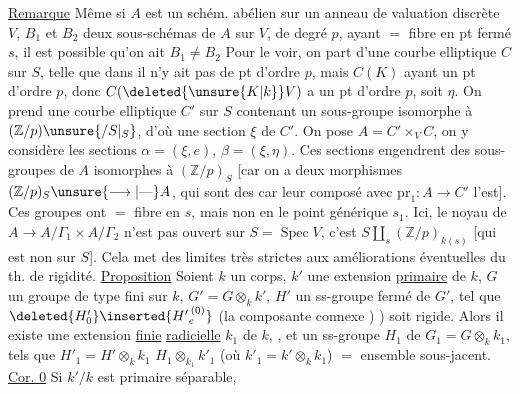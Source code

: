 \uline{Remarque} Même si $A$ est un schém.
\margin{\rule[-3\baselineskip]{0.35pt}{3\baselineskip}\kern2pt\rule[-3\baselineskip]{0.35pt}{3\baselineskip}}abélien sur un anneau de valuation discrète $V$,
$B_1$ et $B_2$ deux sous-schémas  de $A$  
sur $V$, de degré $p$, ayant $=$ fibre
en  pt fermé $s$, il est possible qu'on ait $B_1\ne B_2$
Pour le voir, on part d'une courbe elliptique
 $C$ sur $S$, telle que dans  il n'y ait
pas de pt d'ordre $p$, mais $C(K)$
ayant un pt d'ordre $p$, donc $C(\deleted{\unsure{K|k}}V)$
a un pt d'ordre $p$, soit $\eta$. On
prend une courbe elliptique $C'$ sur $S$
contenant un sous-groupe isomorphe à $(\mathbb Z/p)\unsure{/S|_S}$,
d'où une section $\xi$ de $C'$. On
pose $A=C'\times_V C$, on y considère
les sections $\alpha=(\xi,e)$, $\beta=(\xi,\eta)$. Ces
sections engendrent des sous-groupes  de
$A$ isomorphes à $(\mathbb Z/p)_S$ [car
on a deux morphismes $(\mathbb Z/p)_S\unsure{\longrightarrow|\text{---}}A$,
qui sont des  car leur composé avec $\mathrm{pr}_1:A\longrightarrow C'$ l'est].
Ces groupes ont $=$  fibre en $s$, mais non
en le point générique $s_1$. Ici,
le noyau de $A\longrightarrow A/\Gamma_1\times A/\Gamma_2$ 
n'est pas  ouvert sur $S=\operatorname{Spec} V$, c'est
$S\amalg_s(\mathbb Z/p)_{k(s)}$ [qui est non  sur $S$].
Cela met des limites très strictes aux
améliorations éventuelles du th. de rigidité.
\uline{Proposition} Soient $k$ un corps, $k'$ une extension
\margin{\rule[-4\baselineskip]{0.35pt}{4\baselineskip}}\uline{primaire} de $k$, $G$ un groupe  de type fini sur
$k$, $G'=G\otimes_k k'$, $H'$ un ss-groupe fermé de
$G'$, tel que $\deleted{H'_{0}}\inserted{{H'}^{\,(0)}_e}$ (la composante connexe ) )
soit rigide. Alors il existe une 
extension \uline{finie} \uline{radicielle} $k_1$ de $k$, ,
 et un ss-groupe  $H_1$ de $G_1=G\otimes_k k_1$,
tels que $H'_1=H'\otimes_k k_1$    $H_1\otimes_{k_1}k'_1$
(où $k'_1=k'\otimes_k k_1$)   $=$ ensemble sous-jacent.
\uline{Cor. 0} Si $k'/k$ est  primaire séparable, 


